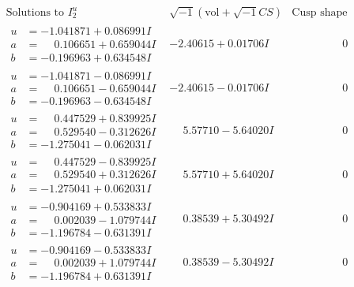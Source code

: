 \documentclass[1p]{elsarticle_modified}
\theoremstyle{definition}
\newcommand{\I}{\sqrt{-1}}
\begin{document}
$$\begin{array}{c|c|c}  
\text{Solutions to }I^u_{2}& \I (\text{vol} + \sqrt{-1}CS) & \text{Cusp shape}\\
 \hline 
\begin{aligned}
u &= -1.041871 + 0.086991 I \\
a &= \phantom{-}0.106651 + 0.659044 I \\
b &= -0.196963 + 0.634548 I\end{aligned}
 & -2.40615 + 0.01706 I & \phantom{-0.000000 } 0 \\ \hline\begin{aligned}
u &= -1.041871 - 0.086991 I \\
a &= \phantom{-}0.106651 - 0.659044 I \\
b &= -0.196963 - 0.634548 I\end{aligned}
 & -2.40615 - 0.01706 I & \phantom{-0.000000 } 0 \\ \hline\begin{aligned}
u &= \phantom{-}0.447529 + 0.839925 I \\
a &= \phantom{-}0.529540 - 0.312626 I \\
b &= -1.275041 - 0.062031 I\end{aligned}
 & \phantom{-}5.57710 - 5.64020 I & \phantom{-0.000000 } 0 \\ \hline\begin{aligned}
u &= \phantom{-}0.447529 - 0.839925 I \\
a &= \phantom{-}0.529540 + 0.312626 I \\
b &= -1.275041 + 0.062031 I\end{aligned}
 & \phantom{-}5.57710 + 5.64020 I & \phantom{-0.000000 } 0 \\ \hline\begin{aligned}
u &= -0.904169 + 0.533833 I \\
a &= \phantom{-}0.002039 - 1.079744 I \\
b &= -1.196784 - 0.631391 I\end{aligned}
 & \phantom{-}0.38539 + 5.30492 I & \phantom{-0.000000 } 0 \\ \hline\begin{aligned}
u &= -0.904169 - 0.533833 I \\
a &= \phantom{-}0.002039 + 1.079744 I \\
b &= -1.196784 + 0.631391 I\end{aligned}
 & \phantom{-}0.38539 - 5.30492 I & \phantom{-0.000000 } 0 \\ \hline\begin{aligned}

\end{aligned}
\end{array}$$
\end{document}
